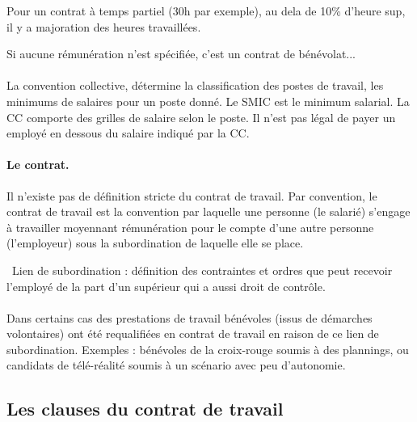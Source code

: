 	Pour un contrat à temps partiel (30h par exemple), au dela de 10\% d’heure sup, il y a majoration des heures travaillées.

	Si aucune rémunération n'est spécifiée, c’est un contrat de bénévolat...

	\paragraph{}
	La convention collective, détermine la classification des postes de travail, les minimums de salaires pour un poste donné.
	Le SMIC est le minimum salarial.
	La CC comporte des grilles de salaire selon le poste.
	Il n’est pas légal de payer un employé en dessous du salaire indiqué par la CC.

	\paragraph{Le contrat.}
	Il n’existe pas de définition stricte du contrat de travail.
	Par convention, le contrat de travail est la convention par laquelle une personne (le salarié) s’engage à travailler moyennant rémunération pour le compte d’une autre personne (l’employeur) sous la subordination de laquelle elle se place.

	\textrightarrow\ Lien de subordination : définition des contraintes et ordres que peut recevoir l’employé de la part d’un supérieur qui a aussi droit de contrôle.

	\paragraph{}
	Dans certains cas des prestations de travail bénévoles (issus de démarches volontaires) ont été requalifiées en contrat de travail en raison de ce lien de subordination.
	Exemples : bénévoles de la croix-rouge soumis à des plannings, ou candidats de télé-réalité soumis à un scénario avec peu d'autonomie.

\subsection{Les clauses du contrat de travail}

